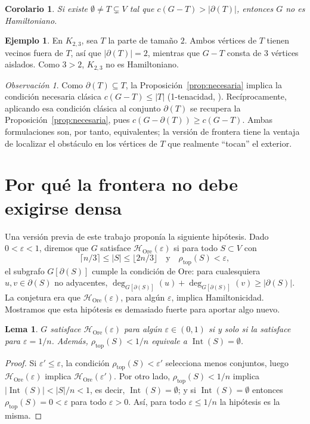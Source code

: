 \documentclass[11pt,a4paper]{article}
\newtheorem{lema}[teorema]{Lema}
\newtheorem{corolario}[teorema]{Corolario}
\theoremstyle{definition}
\newtheorem{ejemplo}[teorema]{Ejemplo}
\theoremstyle{remark}
\newtheorem{observacion}[teorema]{Observación}
\newcommand{\Int}{\operatorname{Int}}
\newcommand{\rtop}{\rho_{\mathrm{top}}}
\begin{document}
\begin{corolario}
Si existe $\emptyset\ne T\subsetneq V$ tal que $c(G-T)>|\partial(T)|$, entonces $G$ no es Hamiltoniano.
\end{corolario}

\begin{ejemplo}
En $K_{2,3}$, sea $T$ la parte de tamaño $2$. Ambos vértices de $T$ tienen vecinos fuera de $T$, así que $|\partial(T)|=2$, mientras que $G-T$ consta de $3$ vértices aislados. Como $3>2$, $K_{2,3}$ no es Hamiltoniano.
\end{ejemplo}

\begin{observacion}
Como $\partial(T)\subseteq T$, la Proposición~\ref{prop:necesaria} implica la condición necesaria clásica $c(G-T)\le|T|$ (1-tenacidad, \cite{chvatal}). Recíprocamente, aplicando esa condición clásica al conjunto $\partial(T)$ se recupera la Proposición~\ref{prop:necesaria}, pues $c(G-\partial(T))\ge c(G-T)$. Ambas formulaciones son, por tanto, equivalentes; la versión de frontera tiene la ventaja de localizar el obstáculo en los vértices de $T$ que realmente ``tocan'' el exterior.
\end{observacion}

\section{Por qué la frontera no debe exigirse densa}\label{sec:ore}

Una versión previa de este trabajo proponía la siguiente hipótesis. Dado $0<\varepsilon<1$, diremos que $G$ satisface $\mathcal{H}_{\mathrm{Ore}}(\varepsilon)$ si para todo $S\subset V$ con
\[
\lceil n/3\rceil\le|S|\le\lfloor 2n/3\rfloor \quad\text{y}\quad \rtop(S)<\varepsilon,
\]
el subgrafo $G[\partial(S)]$ cumple la condición de Ore: para cualesquiera $u,v\in\partial(S)$ no adyacentes,
$\deg_{G[\partial(S)]}(u)+\deg_{G[\partial(S)]}(v)\ge|\partial(S)|$.
La conjetura era que $\mathcal{H}_{\mathrm{Ore}}(\varepsilon)$, para algún $\varepsilon$, implica Hamiltonicidad. Mostramos que esta hipótesis es demasiado fuerte para aportar algo nuevo.

\begin{lema}\label{lem:eps}
$G$ satisface $\mathcal{H}_{\mathrm{Ore}}(\varepsilon)$ para algún $\varepsilon\in(0,1)$ si y solo si la satisface para $\varepsilon=1/n$. Además, $\rtop(S)<1/n$ equivale a $\Int(S)=\emptyset$.
\end{lema}

\begin{proof}
Si $\varepsilon'\le\varepsilon$, la condición $\rtop(S)<\varepsilon'$ selecciona menos conjuntos, luego $\mathcal{H}_{\mathrm{Ore}}(\varepsilon)$ implica $\mathcal{H}_{\mathrm{Ore}}(\varepsilon')$. Por otro lado, $\rtop(S)<1/n$ implica $|\Int(S)|<|S|/n<1$, es decir, $\Int(S)=\emptyset$; y si $\Int(S)=\emptyset$ entonces $\rtop(S)=0<\varepsilon$ para todo $\varepsilon>0$. Así, para todo $\varepsilon\le 1/n$ la hipótesis es la misma.
\end{proof}
\end{document}
